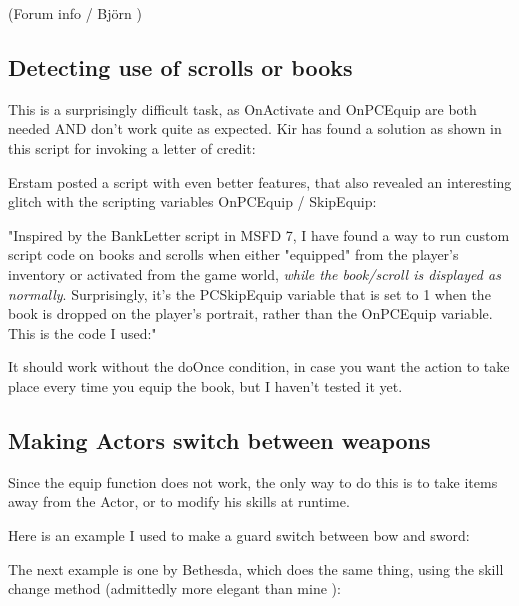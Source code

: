 (Forum info / Björn )

\hypertarget{detecting-use-of-scrolls-or-books}{%
\subsection{\texorpdfstring{\hfill\break
Detecting use of scrolls or
books}{ Detecting use of scrolls or books}}\label{detecting-use-of-scrolls-or-books}}

This is a surprisingly difficult task, as OnActivate and OnPCEquip are
both needed AND don't work quite as expected. Kir has found a solution
as shown in this script for invoking a letter of credit:



Erstam posted a script with even better features, that also revealed an
interesting glitch with the scripting variables OnPCEquip / SkipEquip:

"Inspired by the BankLetter script in MSFD 7, I have found a way to run
custom script code on books and scrolls when either "equipped" from the
player's inventory or activated from the game world, \emph{while the
book/scroll is displayed as normally}. Surprisingly, it's the
PCSkipEquip variable that is set to 1 when the book is dropped on the
player's portrait, rather than the OnPCEquip variable. This is the code
I used:"



It should work without the doOnce condition, in case you want the action
to take place every time you equip the book, but I haven't tested it
yet.

\hypertarget{making-actors-switch-between-weapons}{%
\subsection{\texorpdfstring{\hfill\break
Making Actors switch between
weapons}{ Making Actors switch between weapons}}\label{making-actors-switch-between-weapons}}

Since the equip function does not work, the only way to do this is to
take items away from the Actor, or to modify his skills at runtime.

Here is an example I used to make a guard switch between bow and sword:



The next example is one by Bethesda, which does the same thing, using
the skill change method (admittedly more elegant than mine ):

